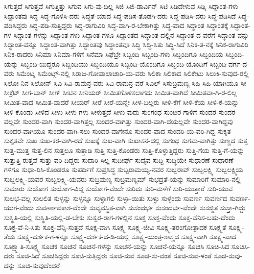{ಸಿಗುತ್ತದೆ
ಸಿಗುತ್ತವೆ
ಸಿಗುತ್ತಿತ್ತು
ಸಿಗುವ
ಸಿಗು-ವು-ದಿಲ್ಲ
ಸಿಜಿ
ಸಿಜಿ-ಡಾರ್ವಿನ್
ಸಿಟಿ
ಸಿಡಿದೇಳುವ
ಸಿಡ್ನಿ
ಸಿದ್ದಾಂತ-ಗಳು
ಸಿದ್ದಾಂತವು
ಸಿದ್ಧ
ಸಿದ್ಧ-ಗೊಳಿಸಿ-ದರು
ಸಿದ್ಧತೆ-ಯಾದ
ಸಿದ್ಧ-ಪಡಿಸ-ತೊಡಗಿ-ದರು
ಸಿದ್ಧ-ಪಡಿಸಿ-ದರು
ಸಿದ್ಧ-ಪಡಿಸಿದೆ
ಸಿದ್ಧ-ಪಡಿಸಿದ್ದರು
ಸಿದ್ಧ-ಪಡಿ-ಸುತ್ತಿದ್ದರು
ಸಿದ್ಧ-ರಾಗುವಿರಿ
ಸಿದ್ಧ-ವಾಗಿ-ರ-ಬೇಕಾಗಿತ್ತು
ಸಿದ್ಧ-ವಾದ
ಸಿದ್ಧಾಂತ
ಸಿದ್ಧಾಂತಕ್ಕೆ
ಸಿದ್ಧಾಂತ-ಗಳ
ಸಿದ್ಧಾಂತ-ಗಳನ್ನು
ಸಿದ್ಧಾಂತ-ಗಳು
ಸಿದ್ಧಾಂತ-ಗಳೂ
ಸಿದ್ಧಾಂತದ
ಸಿದ್ಧಾಂತ-ದಲ್ಲಿನ
ಸಿದ್ಧಾಂತ-ದ-ವರೆಗೆ
ಸಿದ್ಧಾಂತ-ವನ್ನು
ಸಿದ್ಧಾಂತ-ವನ್ನೂ
ಸಿದ್ಧಾಂತ-ವಾಗಿತ್ತು
ಸಿದ್ಧಾಂತವು
ಸಿದ್ಧಾಂತವೂ
ಸಿದ್ಧಿ
ಸಿದ್ಧಿ-ಸಿತು
ಸಿದ್ಧಿ-ಸಿದೆ
ಸಿನಿಕ-ತ-ನಕ್ಕೆ
ಸಿನಿಕ-ರಾಗುವಿರಿ
ಸಿನಿಕ-ರಾದರು
ಸಿನಿಮಾ
ಸಿನಿಮಾ-ಗಳಿಗೆ
ಸಿನೆಮಾ
ಸಿಫೆಬ್ರೇ
ಸಿಬ್ಬಂದಿ
ಸಿಬ್ಬಂದಿ-ಗಳು
ಸಿಬ್ಬಂದಿಗೂ
ಸಿಬ್ಬಂದಿಯ
ಸಿಬ್ಬಂದಿ-ಯನ್ನು
ಸಿಬ್ಬಂದಿ-ಯಿದ್ದರೂ
ಸಿಬ್ಬಂದಿಯು
ಸಿಬ್ಬಂದಿಯೂ
ಸಿಬ್ಬಂದಿ-ಯೊಂದಿಗೂ
ಸಿಬ್ಬಂದಿ-ಯೊಂದಿಗೆ
ಸಿಬ್ಬಂದಿ-ವರ್ಗ-ದ-ವರು
ಸಿಮೆಂಟ್ನ
ಸಿಮೆಂಟ್ಸ್-ನಲ್ಲಿ
ಸಿರಾಜ-ಗೋಪಾಲಾಚಾರಿ-ಯ-ವರು
ಸಿಲಿಕಾ
ಸಿಲಿಕಾದ
ಸಿಲಿಕೇಟು
ಸಿಲುಕಿ-ಸುವುದ-ರಲ್ಲಿ
ಸಿಲೋ-ನಿನ
ಸಿಲೋನ್
ಸಿವಿ
ಸಿವಿ-ರಾಮನ್ರ-ವರು
ಸಿವಿ-ರಾಮನ್ರ-ವರೆ
ಸಿವಿಲ್
ಸಿಸುಬ್ರಮಣ್ಯ
ಸಿಹಿ
ಸಿಹಿ-ಯಾಗಿಯೂ
ಸೀ
ಸೀಕ್ರೆಟ್
ಸೀಗ-ಬಾನ್
ಸೀಗ್
ಸೀಟಿನ
ಸೀನಿಯರ್
ಸೀಮಿತಗೊಳಿಸಲಾಗದು
ಸೀಮಿತ-ವಾಗಿದೆ
ಸೀಮಿತವಾ-ಗಿ-ರ-ಲಿಲ್ಲ
ಸೀಮಿತ-ವಾದ
ಸೀಮಿತ-ವಾದರೆ
ಸೀಯರ್
ಸೀರೆ
ಸೀರೆ-ಯನ್ನೇ
ಸೀಳ-ಬಲ್ಲರು
ಸೀಳಿ-ಕೆಗೆ
ಸೀಳಿ-ಕೆಯ
ಸೀಳಿ-ಕೆ-ಯನ್ನು
ಸೀಳಿ-ಕೊಂಡು
ಸೀಳಿದ
ಸೀಳು
ಸೀಳು-ಗಳು
ಸೀಳುತ್ತದೆ
ಸೀಳು-ವುದು
ಸುಂಗಂಧ
ಸುಂಟರ-ಗಾಳಿಗೆ
ಸುಂದರ
ಸುಂದರ-ವಲ್ಲವೇ
ಸುಂದರ-ವಾಗಿ
ಸುಂದರ-ವಾಗಿತ್ತಲ್ಲ
ಸುಂದರ-ವಾಗಿತ್ತು
ಸುಂದರ-ವಾಗಿ-ದೆಯಲ್ಲವೇ
ಸುಂದರ-ವಾಗಿದ್ದವು
ಸುಂದರ-ವಾಗಿಯೂ
ಸುಂದರ-ವಾಗಿ-ಸಲು
ಸುಂದರ-ವಾಗೇನೂ
ಸುಂದರ-ವಾದ
ಸುಂದರಿ-ಯ-ವರಿ-ಗಿದ್ದ
ಸುಕೃತ
ಸುಕೃತವೇ
ಸುಖ
ಸುಖ-ಕರ-ವಾಗಿ-ರದೆ
ಸುಖಕ್ಕೆ
ಸುಖ-ವಾಗಿ
ಸುಖಾಸನ-ದಲ್ಲಿ
ಸುಗಂಧ
ಸುಗಮ-ವಾಗಿತ್ತು
ಸುಣ್ಣದ
ಸುತ್ತ
ಸುತ್ತ-ಮುತ್ತ
ಸುತ್ತ-ಲಿನ
ಸುತ್ತಲೂ
ಸುತ್ತಾಡಿ
ಸುತ್ತಿ
ಸುತ್ತಿ-ಕೊಂಡರು
ಸುತ್ತಿ-ಕೊಳ್ಳುತ್ತಿದ್ದರು
ಸುತ್ತಿ-ಗೆಯ
ಸುತ್ತಿ-ಗೆ-ಯನ್ನು
ಸುತ್ತುತ್ತಿ-ರುತ್ತವೆ
ಸುತ್ತು-ವರಿ-ದಿದ್ದರು
ಸುದಾರಿ-ಸಿಲ್ಲ
ಸುದೀರ್ಘ
ಸುದೈವ
ಸುದ್ದಿ
ಸುದ್ಧಿಯೇ
ಸುಧಾರಣೆ
ಸುಧಾರಣೆ-ಗಳಿಗೂ
ಸುಧಾ-ರಿಸಿ-ಕೊಂಡರೂ
ಸುಪರ್ದಿಗೆ
ಸುಪ್ರಸಿದ್ಧ
ಸುಬ್ಬರಾಮಯ್ಯ-ನವರ
ಸುಬ್ಬರಾವ್
ಸುಬ್ಬಲಕ್ಷ್ಮಿ
ಸುಬ್ಬಲಕ್ಷ್ಮಿಯ
ಸುಬ್ಬಲಕ್ಷ್ಮಿ-ಯವರ
ಸುಬ್ಬಲಕ್ಷ್ಮಿ-ಯವರು
ಸುಬ್ರಮಣ್ಯ
ಸುಬ್ರಮಣ್ಯಮ್
ಸುಭದ್ರತೆ-ಯನ್ನು
ಸುಮಾರಿಗೆ
ಸುಮಾರಿ-ನಲ್ಲಿ
ಸುಮಾರು
ಸುಯೋಗ
ಸುಯೋಗ-ವಿದ್ದ
ಸುಯೋಗ-ವೆಂದೇ
ಸುರಿದು
ಸುರಿ-ಮಳೆಗೆ
ಸುರಿ-ಯುತ್ತಾರೆ
ಸುರಿ-ಯುವ
ಸುಲಭ-ವಲ್ಲ
ಸುಲಲಿತ
ಸುಳ್ಳನ್ನು
ಸುಳ್ಳನ್ನೂ
ಸುಳ್ಳಾಗಲಿ
ಸುಳ್ಳಾ-ಯಿತು
ಸುಳ್ಳು
ಸುಳ್ಳೆಂದು
ಸುವರ್ಣ
ಸುವರ್ಣದ
ಸುವರ್ಣ-ಯುಗ-ವೆಂದು
ಸುವರ್ಣಾವಕಾಶ-ವೆಂದೇ
ಸುವ್ಯವಸ್ಥಿತ-ವಾಗಿ
ಸುಸಂದರ್ಭ
ಸುಸಂದರ್ಭ-ವೆಂದೇ
ಸುಸಜ್ಜಿತ
ಸುಸ್ತಾ-ಗಿದ್ದು
ಸುಸ್ಥಿತಿ-ಯಲ್ಲಿ
ಸುಸ್ಥಿತಿ-ಯಲ್ಲಿ-ಡ-ಬೇಕು
ಸುಸ್ವರ-ರಾಗ-ಗಳಲ್ಲಿನ
ಸೂಕ್ತ
ಸೂಕ್ತ-ವೆಂದು
ಸೂಕ್ತ-ವೆನಿಸ-ಬಹು-ದೆಂದು
ಸೂಕ್ತ-ವೆ-ನಿ-ಸಿತು
ಸೂಕ್ತ-ವೆನ್ನಿ-ಸುತ್ತದೆ
ಸೂಕ್ಷ-ವಾಗಿ
ಸೂಕ್ಷ್ಮ
ಸೂಕ್ಷ್ಮ-ಜೀವಿ
ಸೂಕ್ಷ್ಮ-ತರಂಗೋತ್ಪಾದಕ
ಸೂಕ್ಷ್ಮತೆ
ಸೂಕ್ಷ್ಮ-ತೆಯ
ಸೂಕ್ಷ್ಮ-ದರ್ಶಕ-ಗ-ಳನ್ನೂ
ಸೂಕ್ಷ್ಮ-ದರ್ಶಕ-ದ-ಡಿ-ಯಲ್ಲಿ
ಸೂಕ್ಷ್ಮ-ಯಂತ್ರ-ಶಾಸ್ತ್ರದ
ಸೂಕ್ಷ್ಮ-ವಾಗಿ
ಸೂಕ್ಷ್ಮ-ವಾದ
ಸೂಕ್ಷ್ಮಾತಿ-ಸೂಕ್ಷ್ಮ
ಸೂಚಕ
ಸೂಚನೆ
ಸೂಚನೆ-ಗಳನ್ನು
ಸೂಚನೆ-ಯನ್ನು
ಸೂಚನೆ-ಯನ್ನೂ
ಸೂಚಿಸಿ
ಸೂಚಿ-ಸಿದ
ಸೂಚಿಸಿ-ದರು
ಸೂಚಿ-ಸಿದೆ
ಸೂಚಿಸಿದ್ದರು
ಸೂಚಿ-ಸುತ್ತಿದ್ದರು
ಸೂಚಿ-ಸುವ
ಸೂಚಿ-ಸು-ವಂತೆ
ಸೂಚಿ-ಸುವ-ಳಂತೆ
ಸೂಚಿ-ಸುವು-ದನ್ನು
ಸೂಚಿ-ಸುವುದೆಂದರೆ
}
